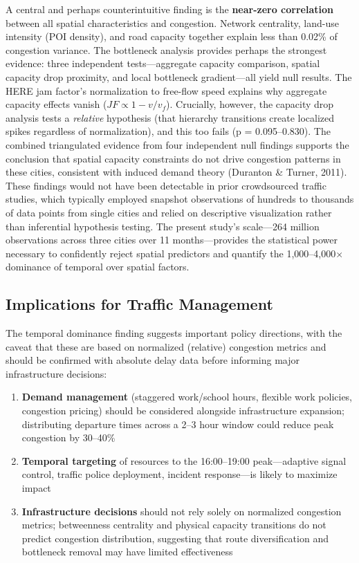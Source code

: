 \documentclass[12pt,a4paper]{article}
\begin{document}
A central and perhaps counterintuitive finding is the \textbf{near-zero correlation} between all spatial characteristics and congestion. Network centrality, land-use intensity (POI density), and road capacity together explain less than 0.02\% of congestion variance. The bottleneck analysis provides perhaps the strongest evidence: three independent tests---aggregate capacity comparison, spatial capacity drop proximity, and local bottleneck gradient---all yield null results. The HERE jam factor's normalization to free-flow speed explains why aggregate capacity effects vanish ($JF \propto 1 - v/v_f$). Crucially, however, the capacity drop analysis tests a \emph{relative} hypothesis (that hierarchy transitions create localized spikes regardless of normalization), and this too fails (p = 0.095--0.830). The combined triangulated evidence from four independent null findings supports the conclusion that spatial capacity constraints do not drive congestion patterns in these cities, consistent with induced demand theory (Duranton \& Turner, 2011). These findings would not have been detectable in prior crowdsourced traffic studies, which typically employed snapshot observations of hundreds to thousands of data points from single cities and relied on descriptive visualization rather than inferential hypothesis testing. The present study's scale---264 million observations across three cities over 11 months---provides the statistical power necessary to confidently reject spatial predictors and quantify the 1,000--4,000$\times$ dominance of temporal over spatial factors.

\subsection{Implications for Traffic Management}

The temporal dominance finding suggests important policy directions, with the caveat that these are based on normalized (relative) congestion metrics and should be confirmed with absolute delay data before informing major infrastructure decisions:

\begin{enumerate}
\item \textbf{Demand management} (staggered work/school hours, flexible work policies, congestion pricing) should be considered alongside infrastructure expansion; distributing departure times across a 2--3 hour window could reduce peak congestion by 30--40\%
\item \textbf{Temporal targeting} of resources to the 16:00--19:00 peak---adaptive signal control, traffic police deployment, incident response---is likely to maximize impact
\item \textbf{Infrastructure decisions} should not rely solely on normalized congestion metrics; betweenness centrality and physical capacity transitions do not predict congestion distribution, suggesting that route diversification and bottleneck removal may have limited effectiveness
\end{enumerate}
\end{document}
